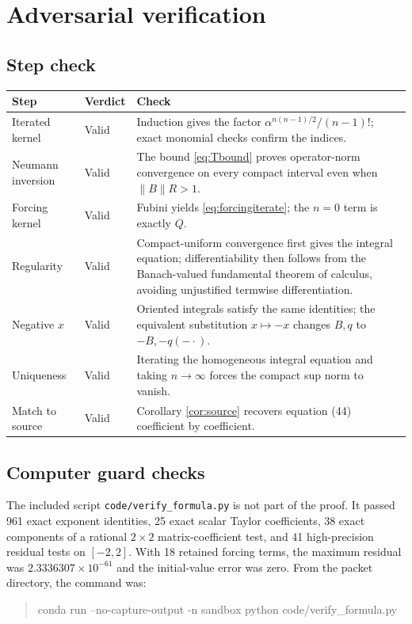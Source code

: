\documentclass[11pt]{article}
\begin{document}
\section{Adversarial verification}

\subsection*{Step check}

\begin{center}
\begin{tabular}{@{}p{}p{}p{}@{}}
\toprule
Step & Verdict & Check \\
\midrule
Iterated kernel & Valid & Induction gives the factor
$\alpha^{n(n-1)/2}/(n-1)!$; exact monomial checks confirm the indices. \\
Neumann inversion & Valid & The bound \eqref{eq:Tbound} proves operator-norm
convergence on every compact interval even when $\|B\|R>1$. \\
Forcing kernel & Valid & Fubini yields \eqref{eq:forcingiterate}; the $n=0$
term is exactly $Q$. \\
Regularity & Valid & Compact-uniform convergence first gives the integral
equation; differentiability then follows from the Banach-valued fundamental
theorem of calculus, avoiding unjustified termwise differentiation. \\
Negative $x$ & Valid & Oriented integrals satisfy the same identities; the
equivalent substitution $x\mapsto-x$ changes $B,q$ to $-B,-q(-\cdot)$. \\
Uniqueness & Valid & Iterating the homogeneous integral equation and taking
$n\to\infty$ forces the compact sup norm to vanish. \\
Match to source & Valid & Corollary \ref{cor:source} recovers equation (44)
coefficient by coefficient. \\
\bottomrule
\end{tabular}
\end{center}

\subsection*{Computer guard checks}

The included script \texttt{code/verify\_formula.py} is not part of the proof.
It passed 961 exact exponent identities, 25 exact scalar Taylor coefficients,
38 exact components of a rational $2\times2$ matrix-coefficient test, and 41
high-precision residual tests on $[-2,2]$.  With 18 retained forcing terms,
the maximum residual was $2.3336307\times10^{-61}$ and the initial-value error
was zero.  From the packet directory, the command was:
\begin{quote}\small\ttfamily
conda run --no-capture-output -n sandbox python code/verify\_formula.py
\end{quote}
\end{document}
